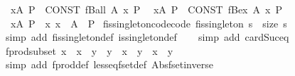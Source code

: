 \begin{isabellebody}
\isanewline
{}\isamarkupfalse%
\isanewline
\ \ {\isachardoublequoteopen}{\isasymforall}x{\isacharbar}{\isasymin}{\isacharbar}A{\isachardot}\ P{\isachardoublequoteclose}\ {\isasymrightleftharpoons}\ {\isachardoublequoteopen}CONST\ fBall\ A\ {\isacharparenleft}{\isasymlambda}x{\isachardot}\ P{\isacharparenright}{\isachardoublequoteclose}\isanewline
\ \ {\isachardoublequoteopen}{\isasymexists}x{\isacharbar}{\isasymin}{\isacharbar}A{\isachardot}\ P{\isachardoublequoteclose}\ {\isasymrightleftharpoons}\ {\isachardoublequoteopen}CONST\ fBex\ A\ {\isacharparenleft}{\isasymlambda}x{\isachardot}\ P{\isacharparenright}{\isachardoublequoteclose}\isanewline
\ \ {\isachardoublequoteopen}{\isasymexists}{\isacharbang}x{\isacharbar}{\isasymin}{\isacharbar}A{\isachardot}\ P{\isachardoublequoteclose}\ {\isasymrightharpoonup}\ {\isachardoublequoteopen}{\isasymexists}{\isacharbang}x{\isachardot}\ x\ {\isacharbar}{\isasymin}{\isacharbar}\ A\ {\isasymand}\ P{\isachardoublequoteclose}\isanewline
\isanewline
{}\isamarkupfalse%
\ fis{\isacharunderscore}singleton{\isacharunderscore}code{\isacharbrackleft}code{\isacharbrackright}{\isacharcolon}\ {\isachardoublequoteopen}fis{\isacharunderscore}singleton\ s\ {\isacharequal}\ {\isacharparenleft}size\ s\ {\isacharequal}\ {}{\isacharparenright}{\isachardoublequoteclose}\isanewline
%
\isadelimproof
\ \ %
\endisadelimproof
%
\isatagproof
{}\isamarkupfalse%
\ {\isacharparenleft}simp\ add{\isacharcolon}\ fis{\isacharunderscore}singleton{\isacharunderscore}def\ is{\isacharunderscore}singleton{\isacharunderscore}def{\isacharparenright}\isanewline
\ \ \isamarkupfalse%
\ {\isacharparenleft}simp\ add{\isacharcolon}\ card{\isacharunderscore}Suc{\isacharunderscore}eq{\isacharparenright}%
\endisatagproof
{\isafoldproof}%
%
\isadelimproof
\isanewline
%
\endisadelimproof
\isanewline
{}\isamarkupfalse%
\ fprod{\isacharunderscore}subset{\isacharcolon}\ {\isachardoublequoteopen}x\ {\isacharbar}{\isasymsubseteq}{\isacharbar}\ x{\isacharprime}\ {\isasymand}\ y\ {\isacharbar}{\isasymsubseteq}{\isacharbar}\ y{\isacharprime}\ {\isasymLongrightarrow}\ x\ {\isacharbar}{\isasymtimes}{\isacharbar}\ y\ {\isacharbar}{\isasymsubseteq}{\isacharbar}\ x{\isacharprime}\ {\isacharbar}{\isasymtimes}{\isacharbar}\ y{\isacharprime}{\isachardoublequoteclose}\isanewline
%
\isadelimproof
\ \ %
\endisadelimproof
%
\isatagproof
{}\isamarkupfalse%
\ {\isacharparenleft}simp\ add{\isacharcolon}\ fprod{\isacharunderscore}def\ less{\isacharunderscore}eq{\isacharunderscore}fset{\isacharunderscore}def\ Abs{\isacharunderscore}fset{\isacharunderscore}inverse{\isacharparenright}\isanewline

\end{isabellebody}
